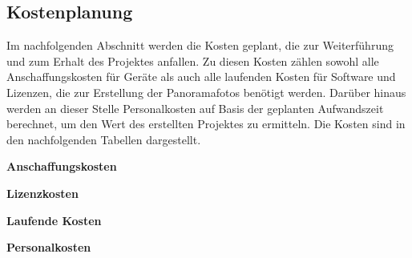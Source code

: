 \subsection{Kostenplanung}
\label{sec:Kostenplanung}

Im nachfolgenden Abschnitt werden die Kosten geplant, die zur Weiterführung und
zum Erhalt des Projektes anfallen. Zu diesen Kosten zählen sowohl alle
Anschaffungskosten für Geräte als auch alle laufenden Kosten für
Software und Lizenzen, die zur Erstellung der Panoramafotos benötigt werden.
Darüber hinaus werden an dieser Stelle Personalkosten auf Basis der geplanten
Aufwandszeit berechnet, um den Wert des erstellten Projektes zu
ermitteln.
Die Kosten sind in den nachfolgenden Tabellen dargestellt. 

\clearpage

\textbf{Anschaffungskosten}

\textbf{Lizenzkosten}



\textbf{Laufende Kosten}

\clearpage
\textbf{Personalkosten}


